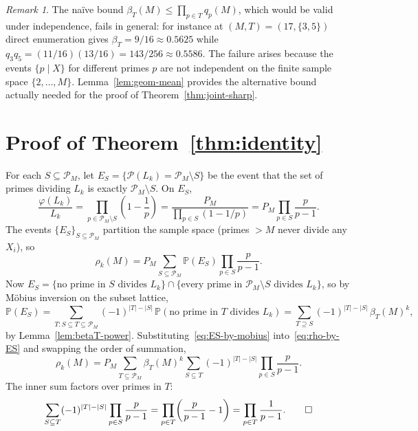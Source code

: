 \documentclass[11pt]{article}
\theoremstyle{remark}
\newtheorem{remark}[theorem]{Remark}
\newcommand{\PP}{\mathbb{P}}
\newcommand{\PM}{\mathcal{P}_M}
\begin{document}
\begin{remark}\label{rem:betaT-violation}
The na\"ive bound $\beta_T(M) \leq \prod_{p \in T} q_p(M)$, which would be valid under independence, fails in general: for instance at $(M, T) = (17, \{3, 5\})$ direct enumeration gives $\beta_T = 9/16 \approx 0.5625$ while $q_3 q_5 = (11/16)(13/16) = 143/256 \approx 0.5586$. The failure arises because the events $\{p \mid X\}$ for different primes $p$ are not independent on the finite sample space $\{2, \ldots, M\}$. Lemma~\ref{lem:geom-mean} provides the alternative bound actually needed for the proof of Theorem~\ref{thm:joint-sharp}.
\end{remark}

\section{Proof of Theorem~\ref{thm:identity}}\label{sec:thm1}

For each $S \subseteq \PM$, let $E_S = \{\mathcal{P}(L_k) = \PM \setminus S\}$ be the event that the set of primes dividing $L_k$ is exactly $\PM \setminus S$. On $E_S$,
\begin{equation}\label{eq:phi-over-L-on-ES}
\frac{\varphi(L_k)}{L_k} = \prod_{p \in \PM \setminus S}\!\left(1 - \frac{1}{p}\right) = \frac{P_M}{\prod_{p \in S}(1 - 1/p)} = P_M \prod_{p \in S} \frac{p}{p-1}.
\end{equation}
The events $\{E_S\}_{S \subseteq \PM}$ partition the sample space (primes $> M$ never divide any $X_i$), so
\begin{equation}\label{eq:rho-by-ES}
\rho_k(M) = P_M \sum_{S \subseteq \PM} \PP(E_S) \prod_{p \in S} \frac{p}{p-1}.
\end{equation}
Now $E_S = \{\text{no prime in $S$ divides $L_k$}\} \cap \{\text{every prime in $\PM \setminus S$ divides $L_k$}\}$, so by M\"obius inversion on the subset lattice,
\begin{equation}\label{eq:ES-by-mobius}
\PP(E_S) = \sum_{T \colon S \subseteq T \subseteq \PM} (-1)^{|T|-|S|}\, \PP(\text{no prime in $T$ divides $L_k$}) = \sum_{T \supseteq S} (-1)^{|T|-|S|}\, \beta_T(M)^k,
\end{equation}
by Lemma~\ref{lem:betaT-power}. Substituting~\eqref{eq:ES-by-mobius} into~\eqref{eq:rho-by-ES} and swapping the order of summation,
\[
\rho_k(M) = P_M \sum_{T \subseteq \PM} \beta_T(M)^k \sum_{S \subseteq T} (-1)^{|T|-|S|} \prod_{p \in S} \frac{p}{p-1}.
\]
The inner sum factors over primes in $T$:
\[
\sum_{S \subseteq T} (-1)^{|T|-|S|} \prod_{p \in S} \frac{p}{p-1} = \prod_{p \in T}\!\left(\frac{p}{p-1} - 1\right) = \prod_{p \in T} \frac{1}{p-1}. \qedhere
\]
\end{document}

